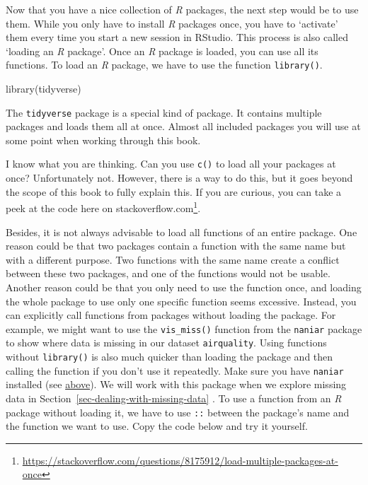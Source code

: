 \documentclass[
  letterpaper,
]{krantz}
\makeatletter
\newenvironment{Shaded}{\begin{snugshade}}{\end{snugshade}}
\newcommand{\FunctionTok}[1]{\textcolor[rgb]{0.28,0.35,0.67}{#1}}
\newcommand{\NormalTok}[1]{\textcolor[rgb]{0.00,0.23,0.31}{#1}}
\renewcommand{\href}[2]{#2\footnote{\url{#1}}}
\newenvironment{kframe}{%
\medskip{}
\setlength{\fboxsep}{.8em}
 \def\at@end@of@kframe{}%
 \ifinner\ifhmode%
  \def\at@end@of@kframe{\end{minipage}}%
  \begin{minipage}{\columnwidth}%
 \fi\fi%
 \def\FrameCommand##1{\hskip\@totalleftmargin \hskip-\fboxsep
 \colorbox{shadecolor}{##1}\hskip-\fboxsep
     \hskip-\linewidth \hskip-\@totalleftmargin \hskip\columnwidth}%
 \MakeFramed {\advance\hsize-\width
   \@totalleftmargin\z@ \linewidth\hsize
   \@setminipage}}%
 {\par\unskip\endMakeFramed%
 \at@end@of@kframe}
\renewenvironment{Shaded}{\begin{kframe}}{\end{kframe}}
\makeatother
\begin{document}
Now that you have a nice collection of \emph{R} packages, the next step
would be to use them. While you only have to install \emph{R} packages
once, you have to `activate' them every time you start a new session in
RStudio. This process is also called `loading an \emph{R} package'. Once
an \emph{R} package is loaded, you can use all its functions. To load an
\emph{R} package, we have to use the function \texttt{library()}.

\begin{Shaded}
\begin{Highlighting}[]
\FunctionTok{library}\NormalTok{(tidyverse)}
\end{Highlighting}
\end{Shaded}

The \texttt{tidyverse} package is a special kind of package. It contains
multiple packages and loads them all at once. Almost all included
packages you will use at some point when working through this book.

I know what you are thinking. Can you use \texttt{c()} to load all your
packages at once? Unfortunately not. However, there is a way to do this,
but it goes beyond the scope of this book to fully explain this. If you
are curious, you can take a peek at the code
\href{https://stackoverflow.com/questions/8175912/load-multiple-packages-at-once}{here
on stackoverflow.com}.

Besides, it is not always advisable to load all functions of an entire
package. One reason could be that two packages contain a function with
the same name but with a different purpose. Two functions with the same
name create a conflict between these two packages, and one of the
functions would not be usable. Another reason could be that you only
need to use the function once, and loading the whole package to use only
one specific function seems excessive. Instead, you can explicitly call
functions from packages without loading the package. For example, we
might want to use the \texttt{vis\_miss()} function from the
\texttt{naniar} package to show where data is missing in our dataset
\texttt{airquality}. Using functions without \texttt{library()} is also
much quicker than loading the package and then calling the function if
you don't use it repeatedly. Make sure you have \texttt{naniar}
installed (see
\hyperref[install-packages-tidyverse-nanair-psych]{above}). We will work
with this package when we explore missing data in
Section~\ref{sec-dealing-with-missing-data} . To use a function from an
\emph{R} package without loading it, we have to use \texttt{::} between
the package's name and the function we want to use. Copy the code below
and try it yourself.
\end{document}
